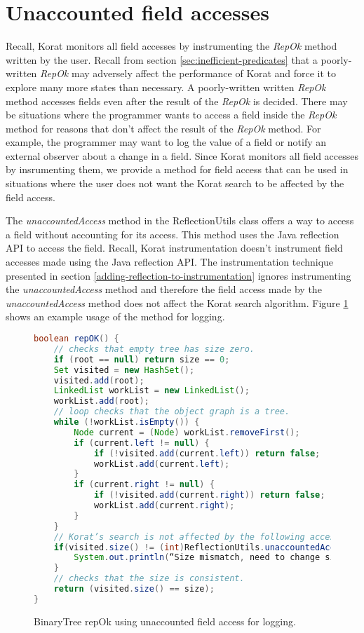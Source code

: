 \section{Unaccounted field accesses}
\label{ch:unaccounted-field-accesses}
Recall, Korat monitors all field accesses by instrumenting the
\emph{RepOk} method written by the user. Recall from section
\ref{sec:inefficient-predicates} that a poorly-written \emph{RepOk}
may adversely affect the performance of Korat and force it to explore
many more states than necessary. A poorly-written written \emph{RepOk}
method accesses fields even after the result of the \emph{RepOk} is
decided. There may be situations where the programmer wants to access
a field inside the \emph{RepOk} method for reasons that don't affect
the result of the \emph{RepOk} method. For example, the programmer may
want to log the value of a field or notify an external observer about
a change in a field. Since Korat monitors all field accesses by
insrumenting them, we provide a method for field access that can be
used in situations where the user does not want the Korat search to be
affected by the field access.

\para The \emph{unaccountedAccess} method in the ReflectionUtils class
offers a way to access a field without accounting for its access. This
method uses the Java reflection API to access the field. Recall, Korat
instrumentation doesn't instrument field accesses made using the Java
reflection API. The instrumentation technique presented in section
\ref{adding-reflection-to-instrumentation} ignores instrumenting the
\emph{unaccountedAccess} method and therefore the field access made by
the \emph{unaccountedAccess} method does not affect the Korat search
algorithm. Figure \ref{fig:bTreeUnaccountedFieldAccess} shows an
example usage of the method for logging. 

\begin{figure}
\centering
\begin{lstlisting}[language=Java]
boolean repOK() {
    // checks that empty tree has size zero.
    if (root == null) return size == 0;
    Set visited = new HashSet();
    visited.add(root);
    LinkedList workList = new LinkedList();
    workList.add(root);
    // loop checks that the object graph is a tree.
    while (!workList.isEmpty()) {
        Node current = (Node) workList.removeFirst();
        if (current.left != null) {
            if (!visited.add(current.left)) return false;
            workList.add(current.left);
        }
        if (current.right != null) {
            if (!visited.add(current.right)) return false;
            workList.add(current.right);
        }
    }
    // Korat’s search is not affected by the following access.
    if(visited.size() != (int)ReflectionUtils.unaccountedAccess(this,”size”)){
        System.out.println(“Size mismatch, need to change size”);
    }
    // checks that the size is consistent.
    return (visited.size() == size);
}
\end{lstlisting}
\caption{BinaryTree repOk using unaccounted field access for logging.}
\label{fig:bTreeUnaccountedFieldAccess}
\end{figure}

